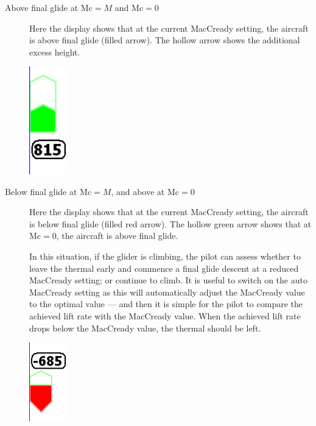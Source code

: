 \documentclass[a4paper,12pt]{refrep}
\begin{document}
\begin{description}

\item[Above final glide at Mc$=M$ and Mc$=0$]
  Here the display shows that at the current MacCready setting, the aircraft
  is above final glide (filled arrow).  The hollow arrow shows the additional
  excess height.

\begin{center}
\includegraphics[angle=0,width=1.6cm,keepaspectratio='true']{figures/fig-finalglide-allabove.png}
\end{center}

\item[Below final glide at Mc$=M$, and above at Mc$=0$]
  Here the display shows that at the current MacCready setting, the aircraft
  is below final glide (filled red arrow).  The hollow green arrow
  shows that at Mc$=0$, the aircraft is above final glide.

  In this situation, if the glider is climbing, the pilot can assess
  whether to leave the thermal early and commence a final glide
  descent at a reduced MacCready setting; or continue to climb.  It is
  useful to switch on the auto MacCready setting as this will
  automatically adjust the MacCready value to the optimal value ---
  and then it is simple for the pilot to compare the achieved lift
  rate with the MacCready value.  When the achieved lift rate drops
  below the MacCready value, the thermal should be left.

\begin{center}
\includegraphics[angle=0,width=1.6cm,keepaspectratio='true']{figures/fig-finalglide-halfabove.png}
\end{center}


\end{description}
\end{document}
